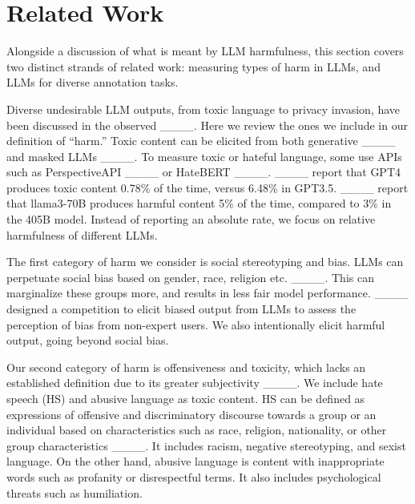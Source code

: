 \section{Related Work}
Alongside a discussion of what is meant by LLM harmfulness,
this section covers two distinct strands of related work: measuring types of harm in LLMs, and LLMs for diverse annotation tasks. %

Diverse undesirable LLM outputs, from toxic language to privacy invasion, have been discussed in the observed ____. Here we review the ones we include in our definition of ``harm.'' %
Toxic content can be elicited from both generative  ____ and masked LLMs ____. 
To measure toxic or hateful language, some use APIs such as PerspectiveAPI ____ or HateBERT ____. ____ report that GPT4 produces toxic content 0.78\% of the time, versus 6.48\% in GPT3.5.
____ report that llama3-70B produces harmful content 5\% of the time, %
compared to 3\% in the 405B model.
Instead of %
reporting an absolute rate, we focus on relative harmfulness of different LLMs. %

The first category of harm we consider is social stereotyping and bias. %
LLMs can perpetuate social bias based on gender, race, religion etc. ____. This can marginalize these groups more, and results in less fair model performance. ____ designed a competition to elicit biased output from LLMs to assess the perception of bias from non-expert users. %
We also intentionally elicit harmful output, going %
beyond social bias.


Our second category of harm is offensiveness and toxicity, which %
lacks an established definition due to its greater subjectivity ____. We include hate speech (HS) and abusive language as toxic content. HS can be defined as expressions of offensive and discriminatory discourse towards a group or an individual based on characteristics such as race, religion, nationality, or other group characteristics ____. It includes racism, negative stereotyping, and sexist language. On the other hand, abusive language is content with inappropriate words such as profanity or disrespectful terms. It also includes psychological threats such as humiliation. %

